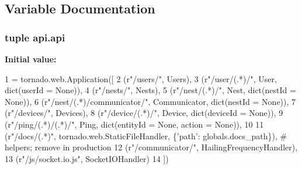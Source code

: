 \subsection{Variable Documentation}
\hypertarget{namespaceapi_a5697ea202319f894facccacf78d93e89}{
\subsubsection[{api}]{\setlength{\rightskip}{0pt plus 5cm}tuple api.\-api}}\label{namespaceapi_a5697ea202319f894facccacf78d93e89}
{\bfseries Initial value\-:}
\begin{DoxyCode}
1 = tornado.web.Application([
2     (\textcolor{stringliteral}{r"/users/"}, Users),
3     (\textcolor{stringliteral}{r"/user/(.*)/"}, User, dict(userId = \textcolor{keywordtype}{None})),
4     (\textcolor{stringliteral}{r"/nests/"}, Nests),
5     (\textcolor{stringliteral}{r"/nest/(.*)/"}, Nest, dict(nestId = \textcolor{keywordtype}{None})),
6     (\textcolor{stringliteral}{r"/nest/(.*)/communicator/"}, Communicator, dict(nestId = \textcolor{keywordtype}{None})),
7     (\textcolor{stringliteral}{r"/devices/"}, Devices),
8     (\textcolor{stringliteral}{r"/device/(.*)/"}, Device, dict(deviceId = \textcolor{keywordtype}{None})),
9     (\textcolor{stringliteral}{r"/ping/(.*)/(.*)/"}, Ping, dict(entityId = \textcolor{keywordtype}{None}, action = \textcolor{keywordtype}{None})),
10     
11     (\textcolor{stringliteral}{r"/docs/(.*)"}, tornado.web.StaticFileHandler, \{\textcolor{stringliteral}{'path'}: globals.docs\_path\}),    \textcolor{comment}{# helpers; remove in
       production}
12     (\textcolor{stringliteral}{r"/communicator/"}, HailingFrequencyHandler),
13     (\textcolor{stringliteral}{r"/js/socket.io.js"}, SocketIOHandler)
14 ])
\end{DoxyCode}
